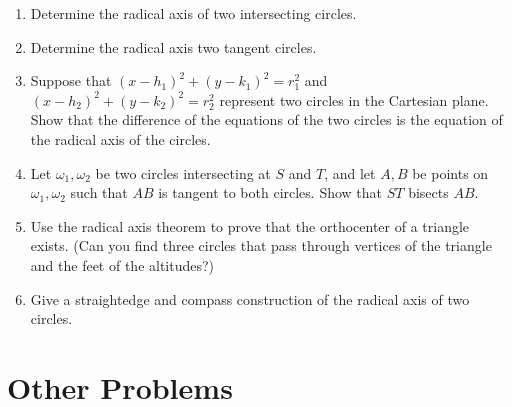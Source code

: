 \documentclass[11pt]{article}
\begin{document}
\begin{enumerate}  
  \item Determine the radical axis of two intersecting circles. 
  
  \item Determine the radical axis two tangent circles. 

  \item Suppose that $(x-h_1)^2 + (y-k_1)^2 = r_1^2$ and $(x-h_2)^2 + (y - k_2)^2 = r_2^2$ represent two circles in the Cartesian plane. Show that the difference of the equations of the two circles is the equation of the radical axis of the circles. 
  
  \item Let $\omega_1,\omega_2$ be two circles intersecting at $S$ and $T$, and let $A,B$ be points on $\omega_1,\omega_2$ such that $AB$ is tangent to both circles. Show that $ST$ bisects $AB$. 
  
  \item Use the radical axis theorem to prove that the orthocenter of a triangle exists. (Can you find three circles that pass through vertices of the triangle and the feet of the altitudes?)
  
  \item Give a straightedge and compass construction of the radical axis of two circles. 
\end{enumerate}

\section{Other Problems}
\end{document}
